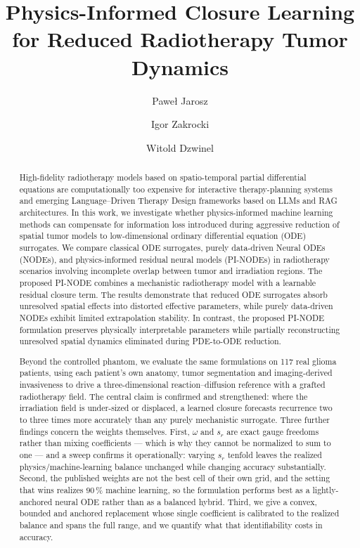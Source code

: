 \documentclass[runningheads]{llncs}
\begin{document}
\title{Physics-Informed Closure Learning for Reduced Radiotherapy Tumor Dynamics}
\author{Paweł Jarosz\and Igor Zakrocki\and Witold Dzwinel}
\maketitle
\begin{abstract}
High-fidelity radiotherapy models based on spatio-temporal partial
differential equations are computationally too expensive for interactive
therapy-planning systems and emerging Language--Driven Therapy Design
frameworks based on LLMs and RAG architectures. In this work, we
investigate whether physics-informed machine learning methods can
compensate for information loss introduced during aggressive reduction
of spatial tumor models to low-dimensional ordinary differential
equation (ODE) surrogates.
We compare classical ODE surrogates, purely data-driven Neural ODEs
(NODEs), and physics-informed residual neural models (PI-NODEs) in
radiotherapy scenarios involving incomplete overlap between tumor and
irradiation regions. The proposed PI-NODE combines a mechanistic
radiotherapy model with a learnable residual closure term.
The results demonstrate that reduced ODE surrogates absorb unresolved
spatial effects into distorted effective parameters, while purely
data-driven NODEs exhibit limited extrapolation stability. In contrast,
the proposed PI-NODE formulation preserves physically interpretable
parameters while partially reconstructing unresolved spatial dynamics
eliminated during PDE-to-ODE reduction.

Beyond the controlled phantom, we evaluate the same formulations on
117 real glioma patients, using each patient's own anatomy, tumor
segmentation and imaging-derived invasiveness to drive a three-dimensional
reaction--diffusion reference with a grafted radiotherapy field. The central
claim is confirmed and strengthened: where the irradiation field is under-sized
or displaced, a learned closure forecasts recurrence two to three times more
accurately than any purely mechanistic surrogate. Three further findings concern
the weights themselves. First, $\omega$ and $s_{r}$ are exact gauge freedoms
rather than mixing coefficients --- which is why they cannot be normalized to
sum to one --- and a sweep confirms it operationally: varying $s_{r}$ tenfold
leaves the realized physics/machine-learning balance unchanged while changing
accuracy substantially. Second, the published weights are not the best cell of
their own grid, and the setting that wins realizes $90\,\%$ machine learning,
so the formulation performs best as a lightly-anchored neural ODE rather than as
a balanced hybrid. Third, we give a convex, bounded and anchored replacement
whose single coefficient is calibrated to the realized balance and spans the
full range, and we quantify what that identifiability costs in accuracy.


\end{abstract}
\end{document}

